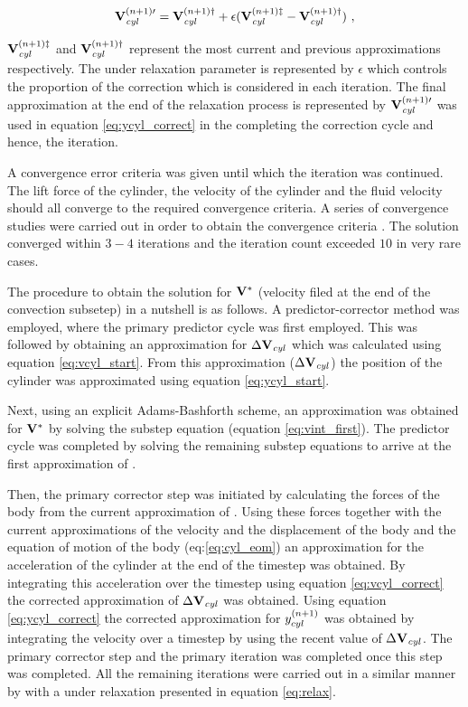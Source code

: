  \begin{equation} \centering
 \label{eq:relax}
 \Vcyl^{(n+1)\prime} = \Vcyl^{(n+1)\dag} + \epsilon(\Vcyl^{(n+1)\ddag} - \Vcyl^{(n+1)\dag}) ~,
 \end{equation}
 
 $\mathbf{V}_{\mathit{cyl}}^{(n+1)\ddag}$ and $\mathbf{V}_{\mathit{cyl}}^{(n+1)\dag}$ represent the most current and previous approximations respectively. The under relaxation parameter is represented by $\epsilon$ which controls the proportion of the correction which is considered in each iteration. The final approximation at the end of the relaxation process is represented by $\mathbf{V}_{\mathit{cyl}}^{(n+1)\prime}$ was used in equation \ref{eq:ycyl_correct} in the completing the correction cycle and hence, the iteration.
 
  A convergence error criteria was given until which the iteration was continued. The lift force of the cylinder, the velocity of the cylinder and the fluid velocity should all converge to the required convergence criteria. A series of convergence studies were carried out in order to obtain the convergence criteria \citep{Pregnalato:thesis}. The solution converged within $3-4$ iterations and the iteration count exceeded $10$ in very rare cases.  
  
  The procedure to obtain the solution for $\mathbf{V}^{*}$ (velocity filed at the end of the convection subsetep) in a nutshell is as follows. A predictor-corrector method was employed, where the primary predictor cycle was first employed. This was followed by obtaining an approximation for $\Delta\mathbf{V}_{\mathit{cyl}}$ which was calculated using equation \ref{eq:vcyl_start}. From this approximation ($\Delta\mathbf{V}_{\mathit{cyl}}$)  the position of the cylinder was approximated using equation \ref{eq:ycyl_start}.
 
 Next, using an explicit Adams-Bashforth scheme, an approximation was obtained for $\mathbf{V}^{*}$ by solving the substep equation (equation \ref{eq:vint_first}). The predictor cycle was completed by solving the remaining substep equations to arrive at the first approximation of \Vnext.   
 
 Then, the primary corrector step was initiated by calculating the forces of the body from the current approximation of \Vnext. Using these forces together with the current approximations of the velocity and the displacement of the body and the equation of motion of the body (eq:\ref{eq:cyl_eom}) an approximation for the acceleration of the cylinder at the end of the timestep was obtained. By integrating this acceleration over the timestep using equation \ref{eq:vcyl_correct} the corrected approximation of $\Delta\mathbf{V}_{\mathit{cyl}}$ was obtained. Using equation \ref{eq:ycyl_correct} the corrected approximation for $y_{cyl}^{(n+1)}$  was obtained by integrating the velocity over a timestep by using the recent value of $\Delta\mathbf{V}_{\mathit{cyl}}$. The primary corrector step and the primary iteration was completed once this step was completed. All the remaining iterations were carried out in a similar manner by with a under relaxation presented in equation \ref{eq:relax}. 
 
